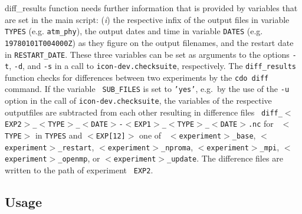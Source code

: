 \begin{description}
\begin{sloppypar}
{    diff\_results} function needs further information that is provided
  by variables that are set in the main script: ({\it i}\/) the
  respective infix
  of the output files in variable {\tt TYPES} (e.g. {\tt atm\_phy}),
  the output dates and time in variable {\tt DATES} (e.g. {\tt
    19780101T004000Z}) as they figure on the output filenames, and the
  restart 
  date in {\tt RESTART\_DATE}. These three variables can be set as
  arguments to the options {\tt -t}, {\tt -d}, and {\tt -s} in a call
  to {\tt icon-dev.checksuite}, respectively.
  The {\tt diff\_results} function checks for differences between two
  experiments by the {\tt cdo diff} command. If the variable {\tt
    SUB\_FILES} is set to {\tt 'yes'}, e.g.~by the use of the {\tt -u}
  option in the call of {\tt icon-dev.checksuite},
  the variables of the respective outputfiles are subtracted
  from each other resulting in
  difference files \newline
{\tt
    diff\_$<$EXP2$>$\_$<$TYPE$>$\_$<$DATE$>$-$<$EXP1$>$\_$<$TYPE$>$\_$<$DATE$>$.nc}
  \newline for {\tt
    $<$TYPE$>$} in {\tt TYPES} and {\tt $<$EXP[12]$>$} one of {\tt
    $<$experiment$>$\_base}, {\tt $<$experiment$>$\_restart}, 
    {\tt $<$experiment$>$\_nproma}, {\tt $<$experiment$>$\_mpi}, 
    {\tt $<$experiment$>$\_openmp}, or
  {\tt $<$experiment$>$\_update}. 
  The difference files are written to the path of experiment {\tt
    EXP2}.\end{sloppypar} 
\end{description}

\subsection{Usage}


